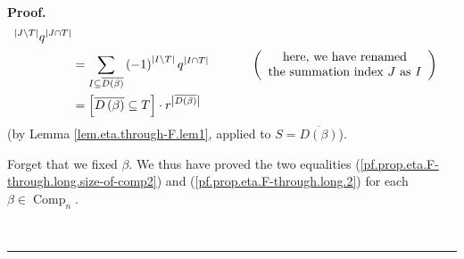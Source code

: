 \documentclass[numbers=enddot,12pt,final,onecolumn,notitlepage]{scrartcl}%
\theoremstyle{definition}
\newenvironment{proof}[1][Proof]{\noindent\textbf{#1.} }{\ \rule{0.5em}{0.5em}}
\let\sumnonlimits\sum
\renewcommand{\sum}{\sumnonlimits\limits}
\newenvironment{verlong}{}{}
\begin{document}
\begin{verlong}
\begin{proof}
\begin{align}
^{\left\vert J\setminus T\right\vert }q^{\left\vert J\cap T\right\vert
}\nonumber\\
&  =\sum_{I\subseteq\overline{D\left(  \beta\right)  }}\left(  -1\right)
^{\left\vert I\setminus T\right\vert }q^{\left\vert I\cap T\right\vert
}\ \ \ \ \ \ \ \ \ \ \left(
\begin{array}
[c]{c}%
\text{here, we have renamed}\\
\text{the summation index }J\text{ as }I
\end{array}
\right) \nonumber\\
&  =\left[  \overline{D\left(  \beta\right)  }\subseteq T\right]  \cdot
r^{\left\vert \overline{D\left(  \beta\right)  }\right\vert }
\label{pf.prop.eta.F-through.long.2}%
\end{align}
(by Lemma \ref{lem.eta.through-F.lem1}, applied to $S=\overline{D\left(
\beta\right)  }$).

Forget that we fixed $\beta$. We thus have proved the two equalities
(\ref{pf.prop.eta.F-through.long.size-of-comp2}) and
(\ref{pf.prop.eta.F-through.long.2}) for each $\beta\in\operatorname*{Comp}%
\nolimits_{n}$.


\end{proof}
\end{verlong}
\end{document}
